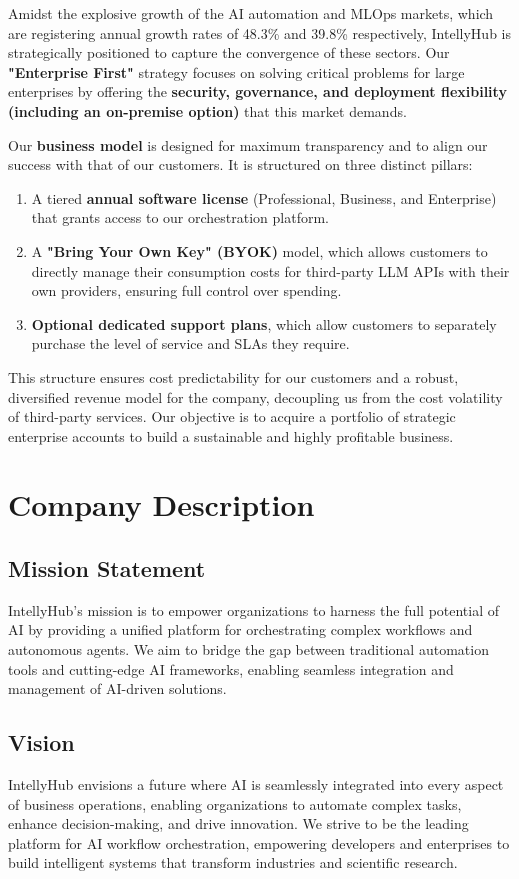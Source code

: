 \documentclass[11pt, a4paper, oneside]{article}
\begin{document}
Amidst the explosive growth of the AI automation and MLOps markets, which are registering annual growth rates of 48.3\% and 39.8\% respectively, IntellyHub is strategically positioned to capture the convergence of these sectors. Our \textbf{"Enterprise First"} strategy focuses on solving critical problems for large enterprises by offering the \textbf{security, governance, and deployment flexibility (including an on-premise option)} that this market demands.

Our \textbf{business model} is designed for maximum transparency and to align our success with that of our customers. It is structured on three distinct pillars:
\begin{enumerate}
    \item A tiered \textbf{annual software license} (Professional, Business, and Enterprise) that grants access to our orchestration platform.
    \item A \textbf{"Bring Your Own Key" (BYOK)} model, which allows customers to directly manage their consumption costs for third-party LLM APIs with their own providers, ensuring full control over spending.
    \item \textbf{Optional dedicated support plans}, which allow customers to separately purchase the level of service and SLAs they require.
\end{enumerate}

This structure ensures cost predictability for our customers and a robust, diversified revenue model for the company, decoupling us from the cost volatility of third-party services. Our objective is to acquire a portfolio of strategic enterprise accounts to build a sustainable and highly profitable business.
\section{Company Description}
\subsection{Mission Statement}
IntellyHub's mission is to empower organizations to harness the full potential of AI by providing a unified platform for orchestrating complex workflows and autonomous agents. We aim to bridge the gap between traditional automation tools and cutting-edge AI frameworks, enabling seamless integration and management of AI-driven solutions.

\subsection{Vision}
IntellyHub envisions a future where AI is seamlessly integrated into every aspect of business operations, enabling organizations to automate complex tasks, enhance decision-making, and drive innovation. We strive to be the leading platform for AI workflow orchestration, empowering developers and enterprises to build intelligent systems that transform industries and scientific research.
\end{document}
